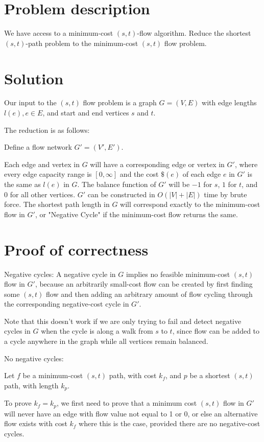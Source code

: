 \documentclass{article}
\begin{document}
\section{Problem description}

We have access to a minimum-cost $(s,t)$-flow algorithm. Reduce the shortest
$(s,t)$-path problem to the minimum-cost $(s,t)$ flow problem.

\section{Solution}

Our input to the $(s,t)$ flow problem is a graph $G = (V,E)$ with edge
lengths $l(e), e \in E$, and start and end vertices $s$ and $t$.

The reduction is as follows:

Define a flow network $G' = (V', E')$. 

Each edge and vertex in $G$ will have a corresponding edge or vertex in $G'$, where
every edge capacity range is $[0, \infty]$ and the cost $\$(e)$ of each edge $e$ in
$G'$ is the same as $l(e)$ in $G$. The balance function of $G'$ will be $-1$ for
$s$, $1$ for $t$, and 0 for all other vertices. $G'$ can be constructed in
$O(|V| + |E|)$ time by brute force. The shortest path length in
$G$ will correspond exactly to the minimum-cost flow in $G'$, or "Negative
Cycle" if the minimum-cost flow returns the same.

\section{Proof of correctness}

Negative cycles: A negative cycle in $G$ implies no feasible minimum-cost
$(s,t)$ flow in $G'$, because an arbitrarily small-cost flow can be created by
first finding some $(s,t)$ flow and then adding an arbitrary amount of flow
cycling through the corresponding negative-cost cycle in $G'$.

Note that this doesn't work if we are only trying to fail and detect negative
cycles in $G$ when the cycle is along a walk from $s$ to $t$, since flow can
be added to a cycle anywhere in the graph while all vertices remain balanced.

No negative cycles:

Let $f$ be a minimum-cost $(s,t)$ path, with cost $k_f$, and
$p$ be a shortest $(s,t)$ path, with length $k_p$.

To prove $k_f = k_p$, we first need to prove that a minimum cost $(s,t)$ flow
in $G'$ will never have an edge with flow value not equal to 1 or 0, or else
an alternative flow exists with cost $k_f$ where this is the case, provided there
are no negative-cost cycles.
\end{document}
